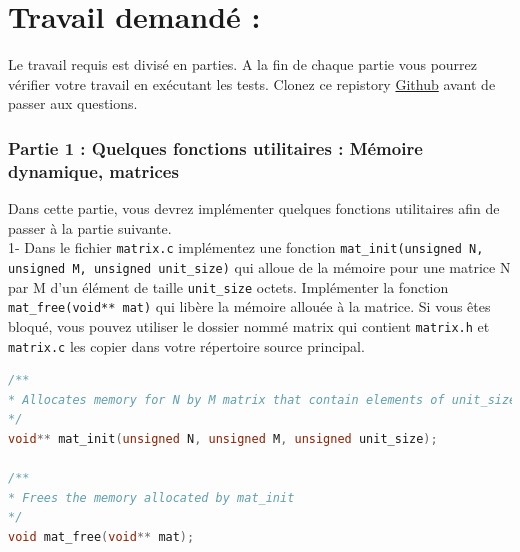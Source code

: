 \documentclass[a4paper]{article}
\begin{document}
	\section*{Travail demandé : }
	Le travail requis est divisé en parties. A la fin de chaque partie vous pourrez vérifier votre travail en exécutant les tests. 
	Clonez ce repistory \href{https://github.com/Darhal/TeachingC/tree/main/assignements/pbs3}{Github} avant de passer aux questions. \\
	
	\subsubsection*{Partie 1 : Quelques fonctions utilitaires : Mémoire dynamique, matrices}
	Dans cette partie, vous devrez implémenter quelques fonctions utilitaires afin de passer à la partie suivante. \\
	
	1- Dans le fichier \texttt{matrix.c} implémentez une fonction \texttt{mat\_init(unsigned N, unsigned M, unsigned unit\_size)} qui alloue de la mémoire pour une matrice N par M d'un élément de taille \texttt{unit\_size} octets. Implémenter la fonction \texttt{mat\_free(void** mat)} qui libère la mémoire allouée à la matrice. Si vous êtes bloqué, vous pouvez utiliser le dossier nommé matrix qui contient \texttt{matrix.h} et \texttt{matrix.c} les copier dans votre répertoire source principal.
	\begin{lstlisting}[language=C]
/**
* Allocates memory for N by M matrix that contain elements of unit_size bytes
*/ 
void** mat_init(unsigned N, unsigned M, unsigned unit_size);

/**
* Frees the memory allocated by mat_init
*/
void mat_free(void** mat);
	\end{lstlisting}
	
\end{document}
